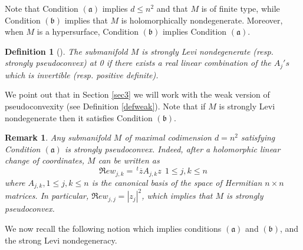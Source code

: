 \documentclass[10pt,a4paper]{amsart}
\newcommand{\transp}{\,^t}
\newcommand{\aaa}{\mathfrak{(a)}}
\newcommand{\bbb}{\mathfrak{(b)}}
\newtheorem{remark}[theo]{Remark}
\newtheorem{defi}[theo]{Definition}
\numberwithin{equation}{section}
\begin{document}
Note that Condition $\aaa$ implies  $d \le n^2$  and  that $M$ is  of finite type, while Condition $\bbb$ implies that $M$ is holomorphically nondegenerate. Moreover,  when $M$ is a hypersurface, Condition $\bbb$ implies Condition  $\aaa$. 

\begin{defi} [\cite{tu}] \label{defnondegtu}
The submanifold $M$ is  {\it strongly Levi nondegenerate} (resp. {\it strongly pseudoconvex}) at 0 if there exists a real linear combination of the $A_j's$ which is invertible (resp. positive definite).
\end{defi}

We point out that in Section \ref{sec3} we will work with the weak version of pseudoconvexity (see Definition  \ref{defweak}).
Note that  if $M$ is  strongly Levi nondegenerate then it satisfies Condition   $\bbb.$ 

\begin{remark}
Any submanifold $M$ of maximal codimension $d=n^2$   satisfying Condition $\aaa$  is strongly pseudoconvex.  
Indeed, after a  holomorphic linear change of coordinates, $M$ can be written as	
\begin{equation*}
\Re e  w_{j,k}=\transp \overline{z} A_{j,k} z \ \ 1\leq j,k \leq n
\end{equation*}
where $A_{j,k}, 1\leq j,k \leq n$ is the canonical basis of the space of Hermitian $n\times n$ matrices. In particular, $\Re e  w_{j,j}=|z_j|^2$, which implies  that $M$  is strongly  pseudoconvex.
\end{remark}
 

We  now recall  the following notion  which implies conditions $\aaa$ and $\bbb$, and the strong  Levi nondegeneracy. 
\end{document}
